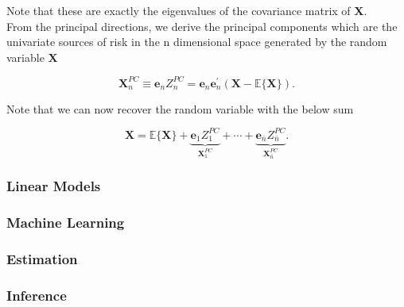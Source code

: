 \documentclass{article}
\theoremstyle{definition}
\theoremstyle{remark}
\begin{document}
Note that these are exactly the eigenvalues of the covariance matrix of $\boldsymbol{X}$.\\
From the principal directions, we derive the principal components which are the univariate sources of risk in the n dimensional
space generated by the random variable $\boldsymbol{X}$

\begin{equation}
    \boldsymbol{X}_{n}^{\mathit{PC}}\equiv\boldsymbol{e}_{n}Z_{n}^{\mathit{PC}}=\boldsymbol{e}_{n}\boldsymbol{e}_{n}^{\prime}(\boldsymbol{X}-\mathbb{E}\{\boldsymbol{X}\})\text{.}
    \end{equation}





Note that we can now recover the random variable with the below sum

\begin{equation}
    \boldsymbol{X}=\mathbb{E}\{\boldsymbol{X}\}+\underbrace{\boldsymbol{e}_{1}Z_{1}^{\mathit{PC}}}_{\boldsymbol{X}_{1}^{\mathit{PC}}}+\cdots +\underbrace{\boldsymbol{e}_{\bar{n}}Z_{\bar{n}}^{\mathit{PC}}}_{\boldsymbol{X}_{\bar{n}}^{\mathit{PC}}}\text{.}
    \end{equation}





















\subsubsection{Linear Models}

\subsubsection{Machine Learning}



\subsubsection{Estimation}

\subsubsection{Inference}
\end{document}
